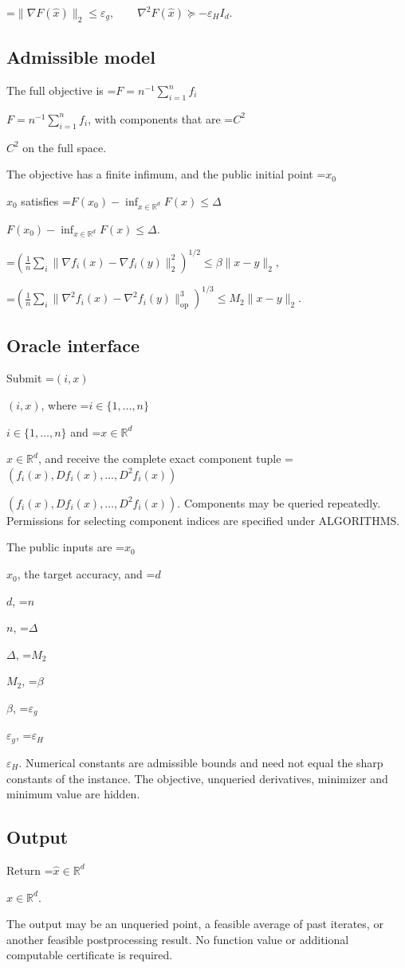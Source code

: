 \documentclass[10pt,a4paper]{article}
\newcommand{\AtlasMath}[1]{\par\begingroup\centering\setbox0=\hbox{$\displaystyle #1$}\ifdim\wd0>1.4\linewidth\typeout{ATLAS WIDE FORMULA: \the\wd0}\fi\ifdim\wd0>\linewidth\resizebox{\linewidth}{!}{\box0}\else\box0\fi\par\endgroup}
\newcommand{\AtlasInlineMath}[1]{\begingroup\setbox0=\hbox{$#1$}\ifdim\wd0>.4\linewidth\endgroup\AtlasMath{#1}\else\endgroup$#1$\fi}
\begin{document}
\AtlasMath{\|\nabla F(\widehat{x})\|_2\le\varepsilon_g,\qquad\nabla^2F(\widehat{x})\succeq-\varepsilon_H I_d.}


\subsection{Admissible model}
The full objective is \AtlasInlineMath{F=n^{-1}\sum_{i=1}^n f_i}, with components that are \AtlasInlineMath{C^2} on the full space.

The objective has a finite infimum, and the public initial point \AtlasInlineMath{x_0} satisfies \AtlasInlineMath{F(x_0)-\inf_{x\in \mathbb{R}^d}F(x)\le\Delta}.


\AtlasMath{\left(\frac1n\sum_i\|\nabla f_i(x)-\nabla f_i(y)\|_2^2\right)^{1/2}\le\beta\|x-y\|_2,}



\AtlasMath{\left(\frac1n\sum_i\|\nabla^2f_i(x)-\nabla^2f_i(y)\|_{\mathrm{op}}^3\right)^{1/3}\le M_2\|x-y\|_2.}


\subsection{Oracle interface}
Submit \AtlasInlineMath{(i,x)}, where \AtlasInlineMath{i\in\{1,\ldots,n\}} and \AtlasInlineMath{x\in\mathbb{R}^d}, and receive the complete exact component tuple \AtlasInlineMath{(f_i(x),Df_i(x),\ldots,D^{2}f_i(x))}. Components may be queried repeatedly. Permissions for selecting component indices are specified under ALGORITHMS.

The public inputs are \AtlasInlineMath{x_0}, the target accuracy, and \AtlasInlineMath{d}, \AtlasInlineMath{n}, \AtlasInlineMath{\Delta}, \AtlasInlineMath{M_2}, \AtlasInlineMath{\beta}, \AtlasInlineMath{\varepsilon_g}, \AtlasInlineMath{\varepsilon_H}. Numerical constants are admissible bounds and need not equal the sharp constants of the instance. The objective, unqueried derivatives, minimizer and minimum value are hidden.

\subsection{Output}
Return \AtlasInlineMath{\widehat{x}\in \mathbb{R}^d}.

The output may be an unqueried point, a feasible average of past iterates, or another feasible postprocessing result. No function value or additional computable certificate is required.
\end{document}

